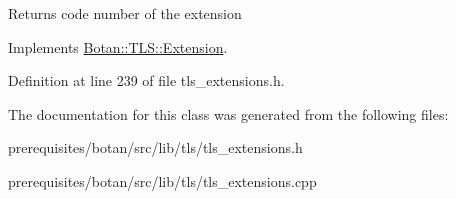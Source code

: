 \begin{DoxyReturn}{Returns}
code number of the extension 
\end{DoxyReturn}


Implements \mbox{\hyperlink{class_botan_1_1_t_l_s_1_1_extension_ac8819b312ce604453225e7b4f7c373ec}{Botan\+::\+T\+L\+S\+::\+Extension}}.



Definition at line 239 of file tls\+\_\+extensions.\+h.



The documentation for this class was generated from the following files\+:\begin{DoxyCompactItemize}
\item 
prerequisites/botan/src/lib/tls/tls\+\_\+extensions.\+h\item 
prerequisites/botan/src/lib/tls/tls\+\_\+extensions.\+cpp\end{DoxyCompactItemize}
